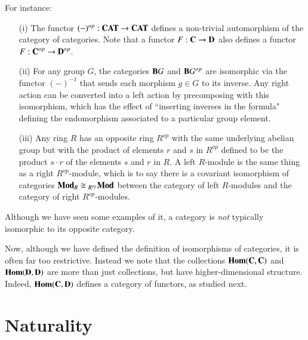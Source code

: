 \documentclass[12pt, a4paper, oneside, openright, titlepage]{book}
\begin{document}
\begin{eg}
    For instance: \begin{enumerate}
        \item[(i)] The functor $(-)^{op}:\normalfont\textbf{CAT}\rightarrow \normalfont\textbf{CAT}$ defines a non-trivial automorphism of the category of categories. Note that a functor $F:\normalfont\textbf{C}\rightarrow \normalfont\textbf{D}$ also defines a functor $F:\normalfont\textbf{C}^{op}\rightarrow \normalfont\textbf{D}^{op}$.
        \item[(ii)] For any group $G$, the categories $\normalfont\textbf{B}G$ and $\normalfont\textbf{B}G^{op}$ are isomorphic via the functor $(-)^{-1}$ that sends each morphism $g \in G$ to its inverse. Any right action can be converted into a left action by precomposing with this isomorphism, which has the effect of ``inserting inverses in the formula" defining the endomorphism associated to a particular group element.
        \item[(iii)] Any ring $R$ has an opposite ring $R^{op}$ with the same underlying abelian group but with the product of elements $r$ and $s$ in $R^{op}$ defined to be the product $s\cdot r$ of the elements $s$ and $r$ in $R$. A left $R$-module is the same thing as a right $R^{op}$-module, which is to say there is a covariant isomorphism of categories $\normalfont\textbf{Mod}_R\cong {_{R^{op}}\normalfont\textbf{Mod}}$ between the category of left $R$-modules and the category of right $R^{op}$-modules.
    \end{enumerate}
\end{eg}

Although we have seen some examples of it, a category is \emph{not} typically isomorphic to its opposite category.

Now, although we have defined the definition of isomorphisms of categories, it is often far too restrictive. Instead we note that the collections $\normalfont\textbf{Hom}(\normalfont\textbf{C},\normalfont\textbf{C})$ and $\normalfont\textbf{Hom}(\normalfont\textbf{D},\normalfont\textbf{D})$ are more than just collections, but have higher-dimensional structure. Indeed, $\normalfont\textbf{Hom}(\normalfont\textbf{C},\normalfont\textbf{D})$ defines a category of functors, as studied next.


\section{Naturality}
\end{document}
